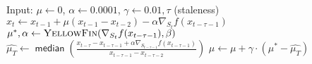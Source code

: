 \begin{algorithm}[h]
	\caption{\Asynctuner}
	\begin{algorithmic}[1]
	\State Input: $\mu\gets0$, $\alpha \gets 0.0001$, $\gamma\gets0.01, \tau$ (staleness)
	\State $x_t\!\gets\!x_{t - 1} + \mu (x_{t - 1} - x_{t - 2} ) - \alpha \nabla_{S_t} f(x_{t - \tau - 1} )$
	\State $\mu^*,\alpha \gets \Call{\tuner}{\nabla_{S_t} f(x_{t - \tau - 1} ), \beta}$ %
	\State $\hat{\mu_T} 
					\gets \mathop{\mathsf{median}}\left(
							\frac{x_{t - \tau} - x_{t - \tau-1} + \alpha \nabla_{S_{t-\tau-1}} f(x_{t - \tau - 1} )}
							{x_{t - \tau-1} - x_{t - \tau-2}}
					\right)$ 
	\State $\mu \leftarrow \mu + \gamma \cdot (\mu^* - \hat{\mu_T})$ 
	\EndFor
\end{algorithmic}
\label{alg:async-algo}
\end{algorithm}


